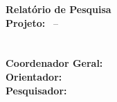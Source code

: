 
\setcounter{page}{1}

\begin{midpage}                        %
  {\centering
    \LARGE \textbf{Relatório de Pesquisa} \\ \vspace{2cm}
    \Large \textbf{Projeto:} \projeto\ -- \siglaprojeto \\ \vspace{1cm}
    \Large \subprojeto \\ \vspace{1cm}
    \Large \projpesq \\ \vspace{1cm}
    \Large \textbf{Coordenador Geral:} \pmlm \\ \vspace{1cm}
    \Large \textbf{Orientador:} \Orientador \\ \vspace{1cm}
    \Large \textbf{Pesquisador:} \pesquisador \\
  }
\end{midpage}
